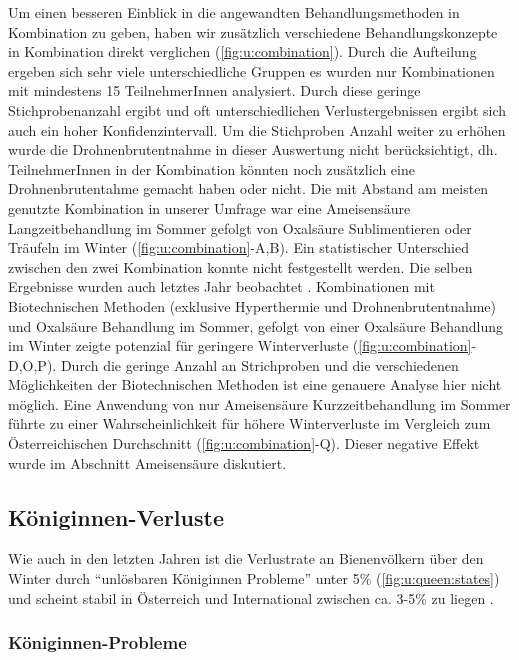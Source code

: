 Um einen besseren Einblick in die angewandten Behandlungsmethoden in Kombination zu geben, haben wir zusätzlich verschiedene Behandlungskonzepte in Kombination direkt verglichen (\cref{fig:u:combination}). Durch die Aufteilung ergeben sich sehr viele unterschiedliche Gruppen es wurden nur Kombinationen mit mindestens 15 TeilnehmerInnen analysiert. Durch diese geringe Stichprobenanzahl ergibt und oft unterschiedlichen Verlustergebnissen ergibt sich auch ein hoher Konfidenzintervall. Um die Stichproben Anzahl weiter zu erhöhen wurde die Drohnenbrutentnahme in dieser Auswertung nicht berücksichtigt, dh. TeilnehmerInnen in der Kombination könnten noch zusätzlich eine Drohnenbrutentahme gemacht haben oder nicht.
\newline
Die mit Abstand am meisten genutzte Kombination in unserer Umfrage war eine Ameisensäure Langzeitbehandlung im Sommer gefolgt von Oxalsäure Sublimentieren oder Träufeln im Winter (\cref{fig:u:combination}-A,B). Ein statistischer Unterschied zwischen den zwei Kombination konnte nicht festgestellt werden. Die selben Ergebnisse wurden auch letztes Jahr beobachtet \citep{oberreiter2020}.
\newline
Kombinationen mit Biotechnischen Methoden (exklusive Hyperthermie und Drohnenbrutentnahme) und Oxalsäure Behandlung im Sommer, gefolgt von einer Oxalsäure Behandlung im Winter zeigte potenzial für geringere Winterverluste (\cref{fig:u:combination}-D,O,P). Durch die geringe Anzahl an Strichproben und die verschiedenen Möglichkeiten der Biotechnischen Methoden ist eine genauere Analyse hier nicht möglich. 
\newline
Eine Anwendung von nur Ameisensäure Kurzzeitbehandlung im Sommer führte zu einer Wahrscheinlichkeit für höhere Winterverluste im Vergleich zum Österreichischen Durchschnitt (\cref{fig:u:combination}-Q). Dieser negative Effekt wurde im Abschnitt Ameisensäure diskutiert. 

\subsection{Königinnen-Verluste}

Wie auch in den letzten Jahren ist die Verlustrate an Bienenvölkern über den Winter durch \enquote{unlösbaren Königinnen Probleme} unter 5\% (\cref{fig:u:queen:states}) und scheint stabil in Österreich und International zwischen ca. 3-5\% zu liegen \citep{brodschneider2019, gray2019, oberreiter2020}.

\subsubsection{Königinnen-Probleme}

